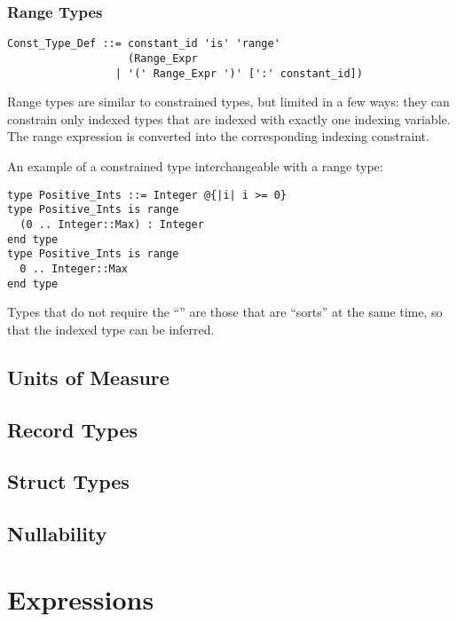 \subsection{Range Types}
\label{sec:range-types}

\syntax\begin{lstlisting}
Const_Type_Def ::= constant_id 'is' 'range' 
                   (Range_Expr 
                 | '(' Range_Expr ')' [':' constant_id])
\end{lstlisting}

Range types are similar to constrained types, but limited in a few ways: they can constrain only indexed types that are indexed with exactly one indexing variable. The range expression is converted into the corresponding indexing constraint. 

\example An example of a constrained type interchangeable with a range type:
\begin{lstlisting}
type Positive_Ints ::= Integer @{|i| i >= 0}
type Positive_Ints is range 
  (0 .. Integer::Max) : Integer 
end type
type Positive_Ints is range
  0 .. Integer::Max
end type
\end{lstlisting}

Types that do not require the ``'' are those that are ``sorts'' at the same time, so that the indexed type can be inferred. 

\section{Units of Measure}
\label{sec:units-of-measure}

\section{Record Types}
\label{sec:record-types}

\section{Struct Types}
\label{sec:struct-types}

\section{Nullability}
\label{sec:nullability}

\chapter{Expressions}

